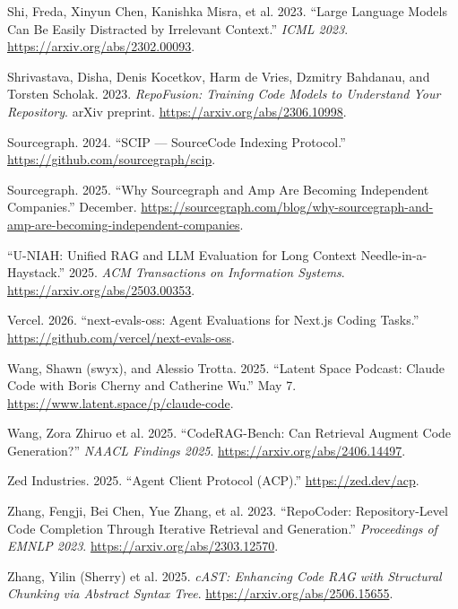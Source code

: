 \documentclass[
  11pt,
  letterpaper,
  numbers=noendperiod,
  parskip=half]{scrartcl}
\newlength{\cslhangindent}
\newenvironment{CSLReferences}[2] %
 {\begin{list}{}{%
  \setlength{\itemindent}{0pt}
  \setlength{\leftmargin}{0pt}
  \setlength{\parsep}{0pt}
  \ifodd #1
   \setlength{\leftmargin}{\cslhangindent}
   \setlength{\itemindent}{-1\cslhangindent}
  \fi
  \setlength{\itemsep}{#2\baselineskip}}}
 {\end{list}}
\begin{document}
\begin{CSLReferences}{1}{1}
Shi, Freda, Xinyun Chen, Kanishka Misra, et al. 2023. {``Large Language
Models Can Be Easily Distracted by Irrelevant Context.''} \emph{ICML
2023}. \url{https://arxiv.org/abs/2302.00093}.

Shrivastava, Disha, Denis Kocetkov, Harm de Vries, Dzmitry Bahdanau, and
Torsten Scholak. 2023. \emph{{RepoFusion}: Training Code Models to
Understand Your Repository}. arXiv preprint.
\url{https://arxiv.org/abs/2306.10998}.

Sourcegraph. 2024. {``{SCIP} --- {SourceCode Indexing Protocol}.''}
\url{https://github.com/sourcegraph/scip}.

Sourcegraph. 2025. {``Why {Sourcegraph} and {Amp} Are Becoming
Independent Companies.''} December.
\url{https://sourcegraph.com/blog/why-sourcegraph-and-amp-are-becoming-independent-companies}.

{``{U-NIAH}: Unified {RAG} and {LLM} Evaluation for Long Context
Needle-in-a-Haystack.''} 2025. \emph{ACM Transactions on Information
Systems}. \url{https://arxiv.org/abs/2503.00353}.

Vercel. 2026. {``{next-evals-oss}: Agent Evaluations for {Next.js}
Coding Tasks.''} \url{https://github.com/vercel/next-evals-oss}.

Wang, Shawn (swyx), and Alessio Trotta. 2025. {``{Latent Space} Podcast:
{Claude Code} with Boris Cherny and Catherine Wu.''} May 7.
\url{https://www.latent.space/p/claude-code}.

{Wang, Zora Zhiruo et al.} 2025. {``{CodeRAG-Bench}: Can Retrieval
Augment Code Generation?''} \emph{NAACL Findings 2025}.
\url{https://arxiv.org/abs/2406.14497}.

Zed Industries. 2025. {``Agent Client Protocol ({ACP}).''}
\url{https://zed.dev/acp}.

Zhang, Fengji, Bei Chen, Yue Zhang, et al. 2023. {``{RepoCoder}:
Repository-Level Code Completion Through Iterative Retrieval and
Generation.''} \emph{Proceedings of EMNLP 2023}.
\url{https://arxiv.org/abs/2303.12570}.

{Zhang, Yilin (Sherry) et al.} 2025. \emph{{cAST}: Enhancing Code RAG
with Structural Chunking via Abstract Syntax Tree}.
\url{https://arxiv.org/abs/2506.15655}.


\end{CSLReferences}
\end{document}

